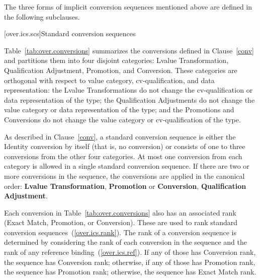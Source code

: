 \pnum
The three forms of implicit conversion sequences mentioned above
are defined in the following subclauses.

[over.ics.scs]{Standard conversion sequences}

\pnum
Table~\ref{tab:over.conversions}
summarizes the conversions defined in Clause~\ref{conv} and
partitions them into four disjoint categories: Lvalue Transformation,
Qualification Adjustment, Promotion, and Conversion.
\enternote
These categories are orthogonal with respect to value category,
cv-qualification, and data representation: the Lvalue Transformations
do not change the cv-qualification or data
representation of the type; the Qualification Adjustments do not
change the value category or data representation of the type; and
the Promotions and Conversions do not change the
value category or cv-qualification of the type.
\exitnote

\pnum
\enternote
As described in Clause~\ref{conv},
a standard conversion sequence is either the Identity conversion
by itself (that is, no conversion) or consists of one to three
conversions from the other
four categories.
At most one conversion from each
category is allowed in a single standard conversion sequence.
If there are two or more conversions in the sequence, the
conversions are applied in the canonical order:
\textbf{Lvalue Transformation},
\textbf{Promotion}
or
\textbf{Conversion},
\textbf{Qualification Adjustment}.
\exitnote

\pnum
{}%
Each conversion in Table~\ref{tab:over.conversions}
also has an associated rank (Exact
Match, Promotion, or Conversion).
These are used
to rank standard conversion sequences~(\ref{over.ics.rank}).
The rank of a conversion sequence is determined by considering the
rank of each conversion in the sequence and the rank of any reference
binding~(\ref{over.ics.ref}).
If any of those has Conversion rank, the
sequence has Conversion rank; otherwise, if any of those has Promotion rank,
the sequence has Promotion rank; otherwise, the sequence has Exact
Match rank.

